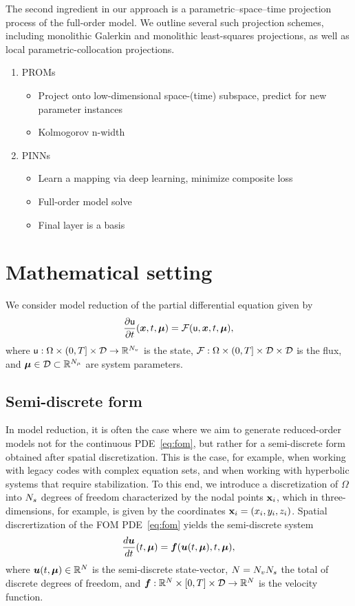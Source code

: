 \documentclass[3p,computermodern,10pt]{elsarticle}
\begin{document}
The second ingredient in our approach is a parametric--space--time projection process of the full-order model. We outline several such projection schemes, including monolithic Galerkin and monolithic least-squares projections, as well as local parametric-collocation projections.  
  
\begin{enumerate}
\item PROMs
\begin{itemize}
\item Project onto low-dimensional space-(time) subspace, predict for new parameter instances
\item Kolmogorov n-width
\end{itemize}
\item PINNs
\begin{itemize}
\item Learn a mapping via deep learning, minimize composite loss
\item Full-order model solve
\item Final layer is a basis
\end{itemize}
\end{enumerate}  
\section{Mathematical setting}
We consider model reduction of the partial differential equation given by
\begin{equation}\label{eq:fom}
\frac{\partial \mathsf{u}}{\partial t}(\boldsymbol x, t,\boldsymbol \mu) = \mathcal{F}(\mathsf{u},\boldsymbol x, t,\boldsymbol \mu), 
\end{equation}
where $\mathsf{u}: \Omega \times (0,T] \times \mathcal{D} \rightarrow \mathbb{R}^{N_v}$ is the state, $\mathcal{F}: \Omega \times (0,T] \times \mathcal{D} \times \mathcal{D}$ is the flux, and $\boldsymbol \mu \in \mathcal{D} \subset \mathbb{R}^{N_{\mu}}$  are system parameters.
\subsection{Semi-discrete form}
In model reduction, it is often the case where we aim to generate reduced-order models not for the continuous PDE~\eqref{eq:fom}, but rather for a semi-discrete form obtained after spatial discretization. This is the case, for example, when working with legacy codes with complex equation sets, and when working with hyperbolic systems that require stabilization. To this end, we introduce a discretization of $\Omega$ into $N_s$ degrees of freedom characterized by the nodal points $\mathbf{x}_i$, which in three-dimensions, for example, is given by the coordinates $\mathbf{x}_i = (x_i,y_i,z_i)$. Spatial discrertization of the FOM PDE~\eqref{eq:fom} yields the semi-discrete system  
$$\frac{d \boldsymbol u}{dt}(t,\boldsymbol \mu) = \boldsymbol f(\boldsymbol u(t,\boldsymbol \mu),t,\boldsymbol \mu),$$
where $\boldsymbol u(t,\boldsymbol \mu) \in \mathbb{R}^{N}$ is the semi-discrete state-vector, $N = N_v N_s$ the total of discrete degrees of freedom, and $\boldsymbol f: \mathbb{R}^{N} \times [0,T] \times \mathcal{D} \rightarrow \mathbb{R}^{N}$ is the velocity function.
\end{document}
